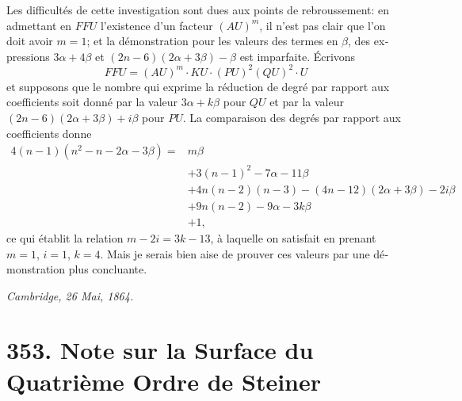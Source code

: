 \documentclass[11pt,a4paper]{article}
\begin{document}
\begin{otherlanguage}{french}
Les difficult\'es de cette investigation sont dues aux points de rebroussement: en admettant en $FFU$ l'existence d'un facteur $(AU)^{m}$, il n'est pas clair que l'on doit avoir $m = 1$; et la d\'emonstration pour les valeurs des termes en $\beta$, des expressions $3\alpha + 4\beta$ et $(2n - 6)(2\alpha + 3\beta) - \beta$ est imparfaite. \'Ecrivons
\[
FFU = (AU)^{m}\cdot KU\cdot (PU)^{2}(QU)^{2}\cdot U
\]
et supposons que le nombre qui exprime la r\'eduction de degr\'e par rapport aux coefficients soit donn\'e par la valeur $3\alpha + k\beta$ pour $QU$ et par la valeur $(2n - 6)(2\alpha + 3\beta) + i\beta$ pour $PU$. La comparaison des degr\'es par rapport aux coefficients donne
\[
\begin{aligned}
4(n - 1)(n^{2} - n - 2\alpha - 3\beta) ={}& m\beta\\
& + 3(n - 1)^{2} - 7\alpha - 11\beta\\
& + 4n(n - 2)(n - 3) - (4n - 12)(2\alpha + 3\beta) - 2i\beta\\
& + 9n(n - 2) - 9\alpha - 3k\beta\\
& + 1,
\end{aligned}
\]
ce qui \'etablit la relation $m - 2i = 3k - 13$, \`a laquelle on satisfait en prenant $m = 1$, $i = 1$, $k = 4$. Mais je serais bien aise de prouver ces valeurs par une d\'emonstration plus concluante.

\medskip
\noindent\hfill\textit{Cambridge, 26 Mai, 1864.}\hfill\null

\end{otherlanguage}

\vspace{2em}

\section*{353. Note sur la Surface du Quatri\`eme Ordre de Steiner}
\end{document}
